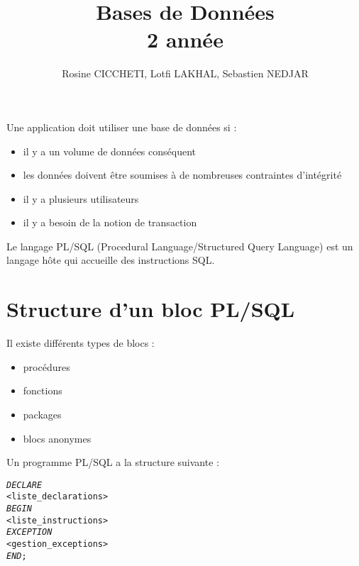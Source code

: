 \documentclass[10pt]{article}
\begin{document}
\title{Bases de Données\\2 année}
\author{Rosine CICCHETI, Lotfi LAKHAL, Sebastien NEDJAR}
\date{}

\maketitle
\setcounter{page}{0} \thispagestyle{empty} %

\newpage
Une application doit utiliser une base de données si :
	\begin{itemize}
		\item il y a un volume de données conséquent
		\item les données doivent être soumises à de nombreuses contraintes d'intégrité
		\item il y a plusieurs utilisateurs
		\item il y a besoin de la notion de transaction
	\end{itemize}
	
Le langage PL/SQL (Procedural Language/Structured Query Language) est un langage hôte qui accueille des instructions SQL.

\part{Structure d'un bloc PL/SQL}
	Il existe différents types de blocs :
		\begin{itemize}
			\item procédures
			\item fonctions
			\item packages
			\item blocs anonymes
		\end{itemize}

	Un programme PL/SQL a la structure suivante :
	\begin{alltt}
		\begin{tabbing}
			\emph{DECLARE}\=\\
						\><liste_declarations>\\
			\emph{BEGIN}\\
						\><liste_instructions>\\
			\emph{EXCEPTION}\\
						\><gestion_exceptions>\\
			\emph{END};
		\end{tabbing}
	\end{alltt}
	
\end{document}
